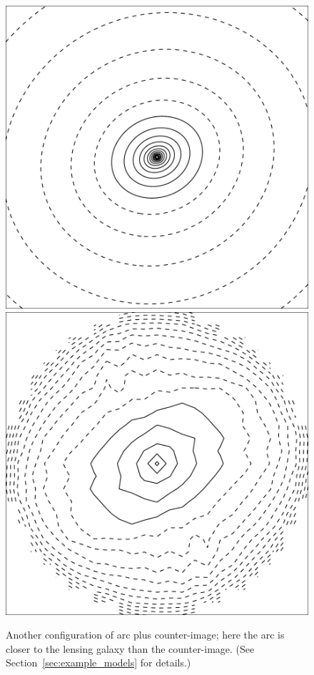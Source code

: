 \documentclass[usenatbib]{mn2e}
\newcommand{\secref}[1]{Section~\ref{sec:#1}}
\newlength{\myplotswidth}
\begin{document}
\begin{figure}
  \includegraphics[width=\myplotswidth]{fig/ASW0002z6f_006919_kappa}
  \includegraphics[width=\myplotswidth]{fig/006919_mass}

  \caption[result 6919 (ASW0002z6f)]{Another configuration of arc plus
    counter-image; here the arc is closer to the lensing galaxy than
    the counter-image. (See \secref{example_models} for details.)
    \vspace{1em}}
  \label{fig:6919}
\end{figure}
\end{document}
